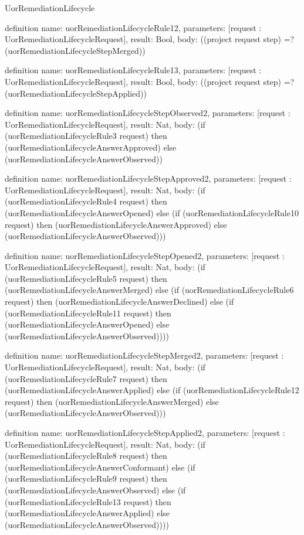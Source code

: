 \begin{lexlean}{UorRemediationLifecycle}
\begin{semanticmodule}
definition{
  name: uorRemediationLifecycleRule12,
  parameters: [request : UorRemediationLifecycleRequest],
  result: Bool,
  body: ((project request step) =? (uorRemediationLifecycleStepMerged))
}

definition{
  name: uorRemediationLifecycleRule13,
  parameters: [request : UorRemediationLifecycleRequest],
  result: Bool,
  body: ((project request step) =? (uorRemediationLifecycleStepApplied))
}

definition{
  name: uorRemediationLifecycleStepObserved2,
  parameters: [request : UorRemediationLifecycleRequest],
  result: Nat,
  body: (if (uorRemediationLifecycleRule3 request) then (uorRemediationLifecycleAnswerApproved) else (uorRemediationLifecycleAnswerObserved))
}

definition{
  name: uorRemediationLifecycleStepApproved2,
  parameters: [request : UorRemediationLifecycleRequest],
  result: Nat,
  body: (if (uorRemediationLifecycleRule4 request) then (uorRemediationLifecycleAnswerOpened) else (if (uorRemediationLifecycleRule10 request) then (uorRemediationLifecycleAnswerApproved) else (uorRemediationLifecycleAnswerObserved)))
}

definition{
  name: uorRemediationLifecycleStepOpened2,
  parameters: [request : UorRemediationLifecycleRequest],
  result: Nat,
  body: (if (uorRemediationLifecycleRule5 request) then (uorRemediationLifecycleAnswerMerged) else (if (uorRemediationLifecycleRule6 request) then (uorRemediationLifecycleAnswerDeclined) else (if (uorRemediationLifecycleRule11 request) then (uorRemediationLifecycleAnswerOpened) else (uorRemediationLifecycleAnswerObserved))))
}

definition{
  name: uorRemediationLifecycleStepMerged2,
  parameters: [request : UorRemediationLifecycleRequest],
  result: Nat,
  body: (if (uorRemediationLifecycleRule7 request) then (uorRemediationLifecycleAnswerApplied) else (if (uorRemediationLifecycleRule12 request) then (uorRemediationLifecycleAnswerMerged) else (uorRemediationLifecycleAnswerObserved)))
}

definition{
  name: uorRemediationLifecycleStepApplied2,
  parameters: [request : UorRemediationLifecycleRequest],
  result: Nat,
  body: (if (uorRemediationLifecycleRule8 request) then (uorRemediationLifecycleAnswerConformant) else (if (uorRemediationLifecycleRule9 request) then (uorRemediationLifecycleAnswerObserved) else (if (uorRemediationLifecycleRule13 request) then (uorRemediationLifecycleAnswerApplied) else (uorRemediationLifecycleAnswerObserved))))
}


\end{semanticmodule}
\end{lexlean}
